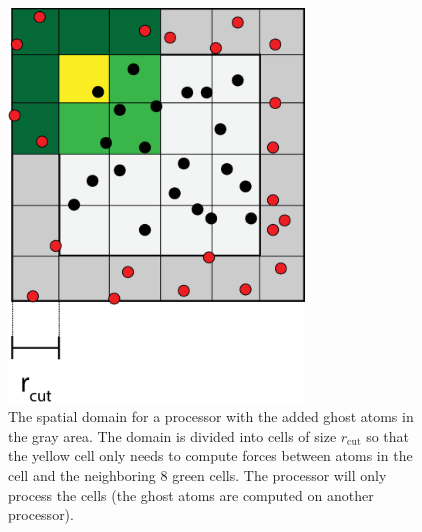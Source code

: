 \begin{figure}[h]
\begin{center}
\includegraphics[width=0.7\textwidth, trim=0cm 0cm 0cm 0cm, clip]{MD/figures/cells.eps}
\end{center}
\caption{The spatial domain for a processor with the added ghost atoms in the gray area. The domain is divided into cells of size $r_\text{cut}$ so that the yellow cell only needs to compute forces between atoms in the cell and the neighboring 8 green cells. The processor will only process the cells (the ghost atoms are computed on another processor).}
\label{fig:md_cells}
\end{figure}
